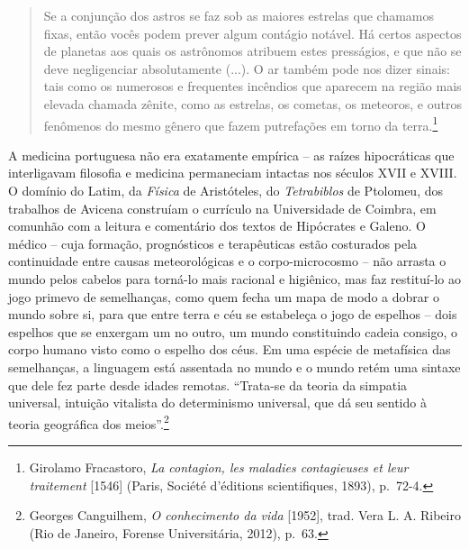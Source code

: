 \begin{quote}
Se a conjunção dos astros se faz sob as maiores estrelas que chamamos
fixas, então vocês podem prever algum contágio notável. Há certos
aspectos de planetas aos quais os astrônomos atribuem estes presságios,
e que não se deve negligenciar absolutamente (...). O ar também pode nos
dizer sinais: tais como os numerosos e frequentes incêndios que aparecem
na região mais elevada chamada zênite, como as estrelas, os cometas, os
meteoros, e outros fenômenos do mesmo gênero que fazem putrefações em
torno da terra.\footnote{Girolamo Fracastoro, \emph{La contagion, les
  maladies contagieuses et leur traitement} {[}1546{]} (Paris, Société
  d'éditions scientifiques, 1893), p.~72-4.}
\end{quote}

A medicina portuguesa não era exatamente empírica -- as raízes
hipocráticas que interligavam filosofia e medicina permaneciam intactas
nos séculos XVII e XVIII. O domínio do Latim, da \emph{Física} de
Aristóteles, do \emph{Tetrabiblos} de Ptolomeu, dos trabalhos de Avicena
construíam o currículo na Universidade de Coimbra, em comunhão com a
leitura e comentário dos textos de Hipócrates e Galeno. O médico -- cuja
formação, prognósticos e terapêuticas estão costurados pela continuidade
entre causas meteorológicas e o corpo-microcosmo -- não arrasta o mundo
pelos cabelos para torná-lo mais racional e higiênico, mas faz
restituí-lo ao jogo primevo de semelhanças, como quem fecha um mapa de
modo a dobrar o mundo sobre si, para que entre terra e céu se estabeleça
o jogo de espelhos -- dois espelhos que se enxergam um no outro, um
mundo constituindo cadeia consigo, o corpo humano visto como o espelho
dos céus. Em uma espécie de metafísica das semelhanças, a linguagem está
assentada no mundo e o mundo retém uma sintaxe que dele fez parte desde
idades remotas. ``Trata-se da teoria da simpatia universal, intuição
vitalista do determinismo universal, que dá seu sentido à teoria
geográfica dos meios''.\footnote{Georges Canguilhem, \emph{O
  conhecimento da vida} {[}1952{]}, trad. Vera L. A. Ribeiro (Rio de
  Janeiro, Forense Universitária, 2012), p.~63.}

